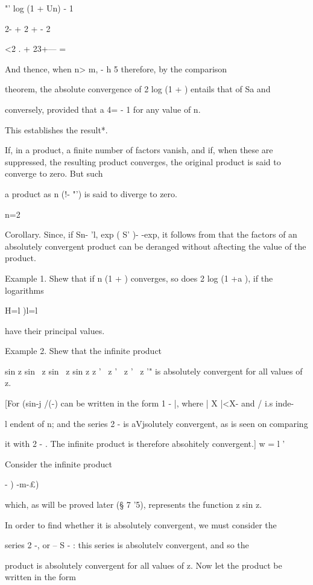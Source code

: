   "' log (1 + Un) - 1

2- + 2 +    - 2

<2 . + 23+--- =

And thence, when n> m, - h 5 therefore, by the comparison

theorem, the absolute convergence of 2 log (1 + ) entails that of Sa
and

conversely, provided that a 4= - 1 for any value of n.

This establishes the result*.

If, in a product, a finite number of factors vanish, and if, when
these are suppressed, the resulting product converges, the original
product is said to converge to zero. But such

a product as n (!- "') is said to diverge to zero.

n=2

Corollary. Since, if Sn- 'l, exp ( S' )- -exp, it follows from
that the factors of an absolutely convergent product can be deranged
without aftecting the value of the product.

Example 1. Shew that if n (1 + ) converges, so does 2 log (1 +a ), if
the logarithms

H=l )l=l

have their principal values.

Example 2. Shew that the infinite product

sin z sin \ z sin \ z sin z z ' \ z ' \ z ' \ z '" is absolutely
convergent for all values of z.

[For (sin-j /(-) can be written in the form 1 - |, where | X |<X- and
/ i.s inde-

l endent of n; and the series 2 - is aVjsolutely convergent, as is
seen on comparing

it with 2 - . The infinite product is therefore absohitely
convergent.] w = l '

Consider the infinite
product

  - ) -m-£)

which, as will be proved later (§ 7 '5), represents the function z sin
z.

In order to find whether it is absolutely convergent, we must consider
the

series 2 -, or -- S - : this series is absolutelv convergent, and so
the

product is absolutely convergent for all values of z. Now let the
product be written in the form

